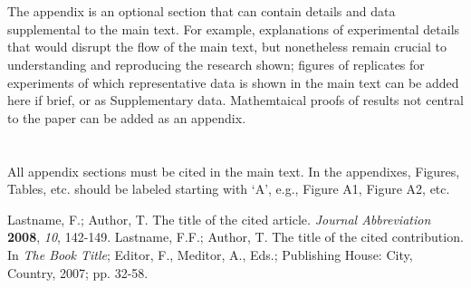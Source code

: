 \documentclass[journal,article,accept,oneauthors,pdftex,10pt,a4paper]{mdpi}
\begin{document}
\appendix
\section{}
The appendix is an optional section that can contain details and data supplemental to the main text. For example, explanations of experimental details that would disrupt the flow of the main text, but nonetheless remain crucial to understanding and reproducing the research shown; figures of replicates for experiments of which representative data is shown in the main text can be added here if brief, or as Supplementary data. Mathemtaical proofs of results not central to the paper can be added as an appendix.

\section{}
All appendix sections must be cited in the main text. In the appendixes, Figures, Tables, etc. should be labeled starting with `A', e.g., Figure A1, Figure A2, etc. 



\renewcommand\bibname{References}
\begin{thebibliography}{999}
Lastname, F.; Author, T. The title of the cited article. {\em Journal Abbreviation} {\bf 2008}, {\em 10}, 142-149.
Lastname, F.F.; Author, T. The title of the cited contribution. In {\em The Book Title}; Editor, F., Meditor, A., Eds.; Publishing House: City, Country, 2007; pp. 32-58.
\end{thebibliography}

%


\end{document}
